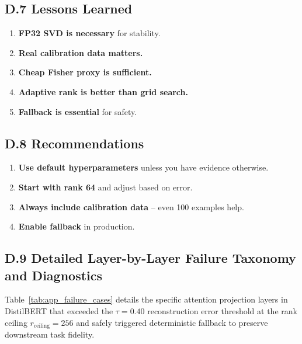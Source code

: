 \subsection{D.7 Lessons Learned}

\begin{enumerate}
\item \textbf{FP32 SVD is necessary} for stability.
\item \textbf{Real calibration data matters.}
\item \textbf{Cheap Fisher proxy is sufficient.}
\item \textbf{Adaptive rank is better than grid search.}
\item \textbf{Fallback is essential} for safety.
\end{enumerate}

\subsection{D.8 Recommendations}

\begin{enumerate}
\item \textbf{Use default hyperparameters} unless you have evidence otherwise.
\item \textbf{Start with rank 64} and adjust based on error.
\item \textbf{Always include calibration data} -- even 100 examples help.
\item \textbf{Enable fallback} in production.
\end{enumerate}

\subsection{D.9 Detailed Layer-by-Layer Failure Taxonomy and Diagnostics}
\label{sec:app_failure_taxonomy}

Table~\ref{tab:app_failure_cases} details the specific attention projection layers in DistilBERT that exceeded the $\tau=0.40$ reconstruction error threshold at the rank ceiling $r_{\mathrm{ceiling}}=256$ and safely triggered deterministic fallback to preserve downstream task fidelity.

